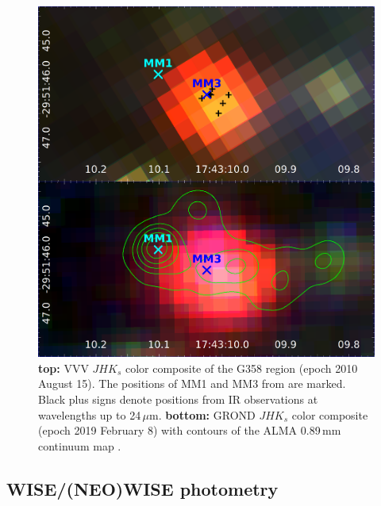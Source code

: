 \begin{figure}   %
\centering
	\includegraphics[width=\columnwidth]{vg_4.png}
	\caption{\textbf{top:} VVV $JHK_s$ color composite of the G358 region (epoch 2010 August 15). The positions of MM1 and MM3 from \citet{2019ApJ...881L..39B} are marked. Black plus signs denote positions from IR observations at wavelengths up to 24\,$\mu$m. \textbf{bottom:} GROND $JHK_s$ color composite (epoch 2019 February 8) with contours of the ALMA 0.89\,mm continuum map \citep{2019ApJ...881L..39B}.
	}
 \label{fig:GROND}
\end{figure}


\subsection{WISE/(NEO)WISE photometry}\label{rneo}

